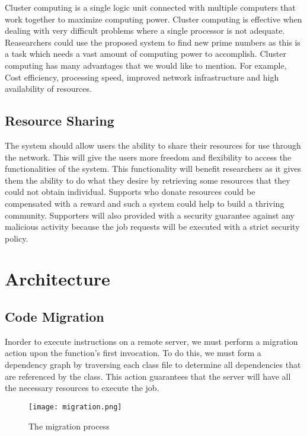 \documentclass[12pt, oneside,english]{article}
\begin{document}
    Cluster computing is a single logic unit connected with multiple
    computers that work together to maximize computing power.
    Cluster computing is effective when dealing with very difficult
    problems where a single processor is not adequate. Reasearchers could
    use the proposed system to find new prime numbers as this is a
    task which needs a vast amount of computing power to accomplish.
    Cluster computing has many advantages that we would like to mention.
    For example, Cost efficiency, processing speed, improved network
    infrastructure and high availability of resources.

    \subsection{Resource Sharing}

    The system should allow users the ability to share their
    resources for use through the network. This will give the
    users more freedom and flexibility to access the functionalities
    of the system. This functionality will benefit researchers as
    it gives them the ability to do what they desire by retrieving
    some resources that they could not obtain individual.
    Supports who donate resources could be compensated with a reward
    and such a system could help to build a thriving community.
    Supporters will also provided with a security guarantee against
    any malicious activity because the job requests will be executed
    with a strict security policy.

    \section{Architecture}\label{sec:architecture}

    \subsection{Code Migration}\label{subsec:migration}

    Inorder to execute instructions on a remote server, we must perform a migration action
    upon the function's first invocation. To do this, we must form a dependency graph
    by traversing each class file to determine all dependencies that are referenced by the class.
    This action guarantees that the server will have all the necessary resources
    to execute the job.

    \begin{figure}[H]
        \centering
        \texttt{[image: migration.png]}
        \caption{The migration process}
    \end{figure}
\end{document}
